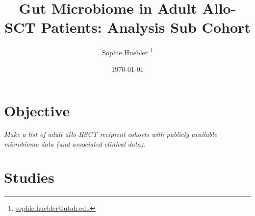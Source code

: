 \documentclass[11pt,a4paper]{article}
\begin{document}
%
\title{Gut Microbiome in Adult Allo-SCT Patients: Analysis Sub Cohort}
\author{Sophie Huebler \thanks{\href{mailto:sophie.huebler@utah.edu}{sophie.huebler@utah.edu}}}
\date{\today}
\maketitle
\renewcommand\abstractname{Objective}
\section*{\abstractname}
\textit{Make a list of adult allo-HSCT recipient cohorts with publicly available microbiome data (and associated clinical data).}
\thispagestyle{empty}
%
%
\tableofcontents
\thispagestyle{empty}
\cleardoublepage
{} 
\newpage
%
%
\section{Studies}
\end{document}
